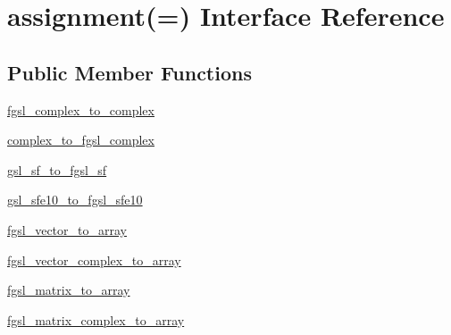 \hypertarget{interfaceassignment_07_0A_08}{\section{assignment(=) Interface Reference}
\label{interfaceassignment_07_0A_08}
}
\subsection*{Public Member Functions}
\begin{DoxyCompactItemize}
\item 
\hyperlink{interfaceassignment_07_0A_08_ac3e93cb4b207d0378198c8dcbaecf770}{fgsl\-\_\-complex\-\_\-to\-\_\-complex}
\item 
\hyperlink{interfaceassignment_07_0A_08_a22cecc540b4b1701b3b05c433ab0e23e}{complex\-\_\-to\-\_\-fgsl\-\_\-complex}
\item 
\hyperlink{interfaceassignment_07_0A_08_a4caa8cce928527c9cb48ff1885b56b48}{gsl\-\_\-sf\-\_\-to\-\_\-fgsl\-\_\-sf}
\item 
\hyperlink{interfaceassignment_07_0A_08_a4692b5faaba4bbfffecfa8639c0ec8f0}{gsl\-\_\-sfe10\-\_\-to\-\_\-fgsl\-\_\-sfe10}
\item 
\hyperlink{interfaceassignment_07_0A_08_a0231891ddc58d8304fdb71378a72ea67}{fgsl\-\_\-vector\-\_\-to\-\_\-array}
\item 
\hyperlink{interfaceassignment_07_0A_08_a688dba997c315053d02a96e240431ca2}{fgsl\-\_\-vector\-\_\-complex\-\_\-to\-\_\-array}
\item 
\hyperlink{interfaceassignment_07_0A_08_a99d7b27946edfff808475c35f97e93d3}{fgsl\-\_\-matrix\-\_\-to\-\_\-array}
\item 
\hyperlink{interfaceassignment_07_0A_08_af9f67de6fa30c8dd905d8b2a8f0cfca9}{fgsl\-\_\-matrix\-\_\-complex\-\_\-to\-\_\-array}
\end{DoxyCompactItemize}


